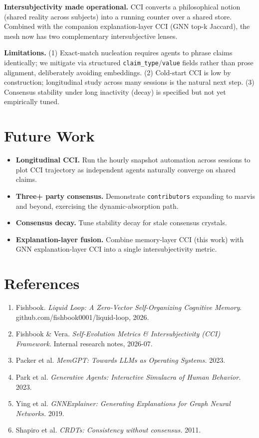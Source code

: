 \documentclass[UTF8]{ctexart}
\begin{document}
\textbf{Intersubjectivity made operational.} CCI converts a philosophical notion
(shared reality across subjects) into a running counter over a shared store.
Combined with the companion explanation-layer CCI (GNN top-k Jaccard), the mesh
now has two complementary intersubjective lenses.

\textbf{Limitations.} (1) Exact-match nucleation requires agents to phrase claims
identically; we mitigate via structured \texttt{claim\_type}/\texttt{value} fields rather than
prose alignment, deliberately avoiding embeddings. (2) Cold-start CCI is low by
construction; longitudinal study across many sessions is the natural next step.
(3) Consensus stability under long inactivity (decay) is specified but not yet
empirically tuned.

\section{Future Work}
\begin{itemize}
  \item \textbf{Longitudinal CCI.} Run the hourly snapshot automation across sessions to
  plot CCI trajectory as independent agents naturally converge on shared claims.
  \item \textbf{Three+ party consensus.} Demonstrate \texttt{contributors} expanding to marvis
  and beyond, exercising the dynamic-absorption path.
  \item \textbf{Consensus decay.} Tune stability decay for stale consensus crystals.
  \item \textbf{Explanation-layer fusion.} Combine memory-layer CCI (this work) with
  GNN explanation-layer CCI into a single intersubjectivity metric.
\end{itemize}

\section*{References}
\begin{enumerate}
  \item Fishbook. \emph{Liquid Loop: A Zero-Vector Self-Organizing Cognitive Memory}.
  github.com/fishbook0001/liquid-loop, 2026.
  \item Fishbook \& Vera. \emph{Self-Evolution Metrics \& Intersubjectivity (CCI) Framework}.
  Internal research notes, 2026-07.
  \item Packer et al. \emph{MemGPT: Towards LLMs as Operating Systems.} 2023.
  \item Park et al. \emph{Generative Agents: Interactive Simulacra of Human Behavior.} 2023.
  \item Ying et al. \emph{GNNExplainer: Generating Explanations for Graph Neural Networks.} 2019.
  \item Shapiro et al. \emph{CRDTs: Consistency without consensus.} 2011.
\end{enumerate}
\end{document}
